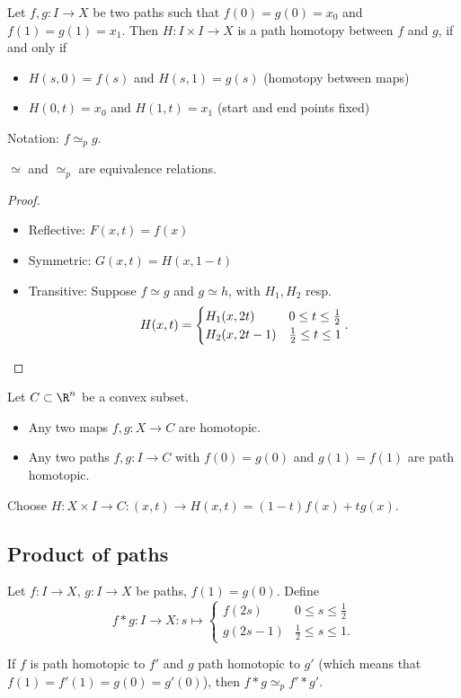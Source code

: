 \begin{definition}
    Let $f, g: I \to  X$ be two paths such that $f(0) = g(0) = x_0$ and $f(1) = g(1) = x_1$. Then $H: I \times  I \to  X$ is a path homotopy between $f$ and $g$, if and only if
    \begin{itemize}
        \item $H(s,0) = f(s)$ and  $H(s, 1) = g(s)$ (homotopy between maps)
        \item  $H(0, t) = x_0$ and $H(1, t) = x_1$ (start and end points fixed)
    \end{itemize}
    Notation: $f \simeq_p g$.
\end{definition}


\begin{lemma}
    $\simeq$ and  $\simeq_p$ are equivalence relations.
\end{lemma}
\begin{proof}
    \leavevmode
    \begin{itemize}
        \item Reflective: $F(x, t) = f(x)$
        \item Symmetric: $G(x, t) = H(x, 1-t)$ 
        \item Transitive:  Suppose $f \simeq g$ and  $g \simeq h$, with  $H_1, H_2$ resp.
            \[
                H(x, t) = \begin{cases}
                    H_1(x, 2t) & 0 \le t \le  \frac{1}{2}\\
                    H_2(x, 2t-1) & \frac{1}{2} \le  t \le  1
                \end{cases}
            . \qedhere
        \] 
    \end{itemize}
\end{proof}


\begin{eg}
   Let $C \subset \R^n$ be a convex subset.
   \begin{itemize}
       \item Any two maps $f, g: X \to C$ are homotopic.
       \item Any two paths $f, g: I \to  C$ with $f(0) = g(0)$ and  $g(1) = f(1)$ are path homotopic.
   \end{itemize}

   Choose $H: X \times I \to  C: (x, t) \to  H(x, t) = (1-t) f(x) + t g(x)$.
\end{eg}


\subsection*{Product of paths}
Let $f: I\to X$, $g: I \to X$ be paths, $f(1) = g(0)$.
Define  \[
    f*g: I \to X: s \mapsto \begin{cases}
        f(2s) & 0 \le  s \le  \frac{1}{2}\\
        g(2s - 1) & \frac{1}{2}\le s\le 1.
\end{cases}
\]
\begin{remark}
    If $f$ is path homotopic to $f'$ and $g$ path homotopic to $g'$ (which means that $f(1) = f'(1) = g(0) = g'(0)$), then $f * g \simeq_p f' * g'$.
\end{remark}

